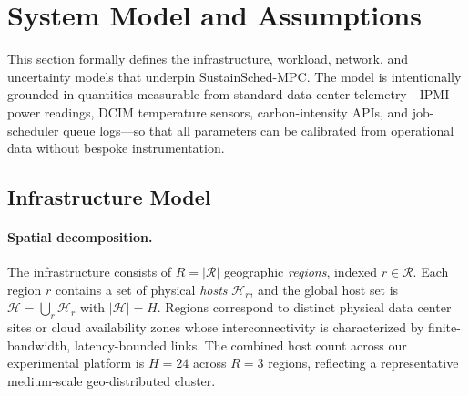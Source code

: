 \documentclass[a4paper,fleqn]{cas-dc}
\begin{document}
\section{System Model and Assumptions}
\label{sec:system}

This section formally defines the infrastructure, workload, network, and uncertainty models that underpin SustainSched-MPC. The model is intentionally grounded in quantities measurable from standard data center telemetry---IPMI power readings, DCIM temperature sensors, carbon-intensity APIs, and job-scheduler queue logs---so that all parameters can be calibrated from operational data without bespoke instrumentation.

\subsection{Infrastructure Model}
\label{sec:infra}

\paragraph{Spatial decomposition.}
The infrastructure consists of $R = |\mathcal{R}|$ geographic \emph{regions}, indexed $r \in \mathcal{R}$. Each region $r$ contains a set of physical \emph{hosts} $\mathcal{H}_r$, and the global host set is $\mathcal{H} = \bigcup_{r} \mathcal{H}_r$ with $|\mathcal{H}| = H$. Regions correspond to distinct physical data center sites or cloud availability zones whose interconnectivity is characterized by finite-bandwidth, latency-bounded links. The combined host count across our experimental platform is $H = 24$ across $R = 3$ regions, reflecting a representative medium-scale geo-distributed cluster.
\end{document}
